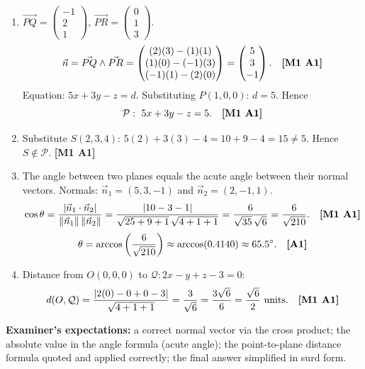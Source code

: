 \documentclass[11pt]{article}
\begin{document}
\begin{corrige}
\begin{enumerate}
\item $\vec{PQ} = \begin{pmatrix} -1 \\ 2 \\ 1 \end{pmatrix}$, $\vec{PR} = \begin{pmatrix} 0 \\ 1 \\ 3 \end{pmatrix}$.
\[
\vec{n} = \vec{PQ} \wedge \vec{PR} = \begin{pmatrix} (2)(3) - (1)(1) \\ (1)(0) - (-1)(3) \\ (-1)(1) - (2)(0) \end{pmatrix} = \begin{pmatrix} 5 \\ 3 \\ -1 \end{pmatrix}. \quad \text{\textbf{[M1 A1]}}
\]
Equation: $5x + 3y - z = d$. Substituting $P(1, 0, 0)$: $d = 5$. Hence
\[
\mathcal{P}: \ 5x + 3y - z = 5. \quad \text{\textbf{[M1 A1]}}
\]
\item Substitute $S(2, 3, 4)$: $5(2) + 3(3) - 4 = 10 + 9 - 4 = 15 \neq 5$. Hence $S \notin \mathcal{P}$. \quad \textbf{[M1 A1]}
\item The angle between two planes equals the acute angle between their normal vectors. Normals: $\vec{n}_1 = (5, 3, -1)$ and $\vec{n}_2 = (2, -1, 1)$.
\[
\cos\theta = \frac{|\vec{n}_1 \cdot \vec{n}_2|}{\|\vec{n}_1\|\,\|\vec{n}_2\|} = \frac{|10 - 3 - 1|}{\sqrt{25 + 9 + 1}\,\sqrt{4 + 1 + 1}} = \frac{6}{\sqrt{35}\,\sqrt{6}} = \frac{6}{\sqrt{210}}. \quad \text{\textbf{[M1 A1]}}
\]
\[
\theta = \arccos\left(\frac{6}{\sqrt{210}}\right) \approx \arccos(0.4140) \approx 65.5^{\circ}. \quad \text{\textbf{[A1]}}
\]
\item Distance from $O(0,0,0)$ to $\mathcal{Q}: 2x - y + z - 3 = 0$:
\[
d(O, \mathcal{Q}) = \frac{|2(0) - 0 + 0 - 3|}{\sqrt{4 + 1 + 1}} = \frac{3}{\sqrt{6}} = \frac{3\sqrt{6}}{6} = \frac{\sqrt{6}}{2} \text{ units}. \quad \text{\textbf{[M1 A1]}}
\]
\end{enumerate}
\textbf{Examiner's expectations:} a correct normal vector via the cross product; the absolute value in the angle formula (acute angle); the point-to-plane distance formula quoted and applied correctly; the final answer simplified in surd form.
\end{corrige}
\end{document}
